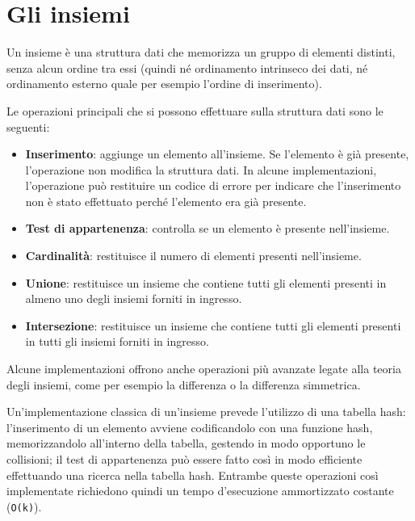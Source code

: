 \section{Gli insiemi}

Un insieme è una struttura dati che memorizza un gruppo di elementi distinti, senza alcun ordine tra
essi (quindi né ordinamento intrinseco dei dati, né ordinamento esterno quale per esempio l'ordine
di inserimento).

Le operazioni principali che si possono effettuare sulla struttura dati sono le seguenti:

\begin{itemize}
	\medskip

	\item
	\textbf{Inserimento}: aggiunge un elemento all'insieme. Se l'elemento è già presente,
	l'operazione non modifica la struttura dati. In alcune implementazioni, l'operazione può 
	restituire un codice di errore per indicare che l'inserimento non è stato effettuato
	perché l'elemento era già presente.

	\item
	\textbf{Test di appartenenza}: controlla se un elemento è presente nell'insieme.

	\item
	\textbf{Cardinalità}: restituisce il numero di elementi presenti nell'insieme.

	\item
	\textbf{Unione}: restituisce un insieme che contiene tutti gli elementi presenti in almeno uno
	degli insiemi forniti in ingresso.

	\item
	\textbf{Intersezione}: restituisce un insieme che contiene tutti gli elementi presenti in tutti
	gli insiemi forniti in ingresso.
\end{itemize}

Alcune implementazioni offrono anche operazioni più avanzate legate alla teoria degli insiemi,
come per esempio la differenza o la differenza simmetrica. 

Un'implementazione classica di un'insieme prevede l'utilizzo di una tabella hash: l'inserimento
di un elemento avviene codificandolo con una funzione hash, memorizzandolo all'interno della
tabella, gestendo in modo opportuno le collisioni; il test di appartenenza può essere fatto così in
modo efficiente effettuando una ricerca nella tabella hash. Entrambe queste operazioni così 
implementate richiedono quindi un tempo d'esecuzione ammortizzato costante (\verb|O(k)|).

